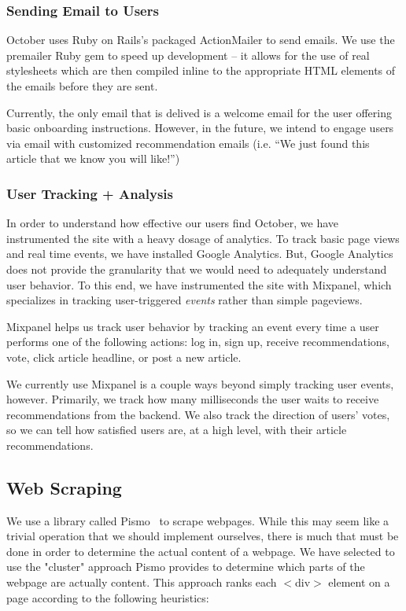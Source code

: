 \documentclass[11pt,letterpaper,titlepage]{article}
\begin{document}
\subsubsection{Sending Email to Users}
October uses Ruby on Rails's packaged ActionMailer to send emails.
We use the premailer Ruby gem to speed up development -- it allows for the use of real stylesheets which are then compiled inline to the appropriate HTML elements of the emails before they are sent.

Currently, the only email that is delived is a welcome email for the user offering basic onboarding instructions.
However, in the future, we intend to engage users via email with customized recommendation emails (i.e. ``We just found this article that we know you will like!'')

\subsubsection{User Tracking + Analysis}
\label{sec:tracking}
In order to understand how effective our users find October, we have instrumented the site with a heavy dosage of analytics.
To track basic page views and real time events, we have installed Google Analytics.
But, Google Analytics does not provide the granularity that we would need to adequately understand user behavior.
To this end, we have instrumented the site with Mixpanel\cite{mixpanel}, which specializes in tracking user-triggered \textit{events} rather than simple pageviews.

Mixpanel helps us track user behavior by tracking an event every time a user performs one of the following actions: log in, sign up, receive recommendations, vote, click article headline, or post a new article.

We currently use Mixpanel is a couple ways beyond simply tracking user events, however. Primarily, we track how many milliseconds the user waits to receive recommendations from the backend.
We also track the direction of users' votes, so we can tell how satisfied users are, at a high level, with their article recommendations.

\subsection{Web Scraping}
\label{sec:scraping}
We use a library called Pismo~\cite{pismo} to scrape
webpages.  While this may seem like a trivial operation that we should implement
ourselves, there is much that must be done in order to determine the actual
content of a webpage.  We have selected to use the "cluster" approach Pismo
provides to determine which parts of the webpage are actually content.  This
approach ranks each $<$div$>$ element on a page according to the following
heuristics:
\end{document}
